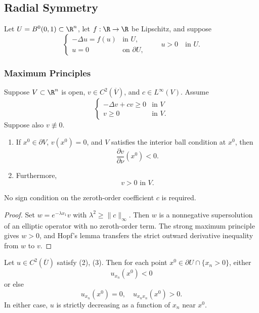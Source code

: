 \subsection{Radial Symmetry}
\label{sec:radial-symmetry}

Let $U=B^0(0,1)\subset\R^n$, let $f:\R\to\R$ be Lipschitz, and suppose
\[
\begin{cases}
-\Delta u=f(u) & \text{in }U,\\
u=0 & \text{on }\partial U,
\end{cases}
\tag{2}
\qquad
u>0\quad\text{in }U.
\tag{3}
\]

\subsubsection{Maximum Principles}
\label{sec:maximum-principles-radial-symmetry}

\begin{lemma}
\label{lem:hopf-lemma-refinement}
Suppose $V \subset \R^n$ is open, $v \in C^2(\overline{V})$, and $c \in L^\infty(V)$. Assume
\[
\begin{cases} -\Delta v + cv \geq 0 & \text{in } V \\ v \geq 0 & \text{in } V. \end{cases}
\tag{4}
\]
Suppose also $v \not\equiv 0$.
\begin{enumerate}
\item[(i)] If $x^0 \in \partial V$, $v(x^0) = 0$, and $V$ satisfies the interior ball condition at $x^0$, then
\[
\frac{\partial v}{\partial \nu}(x^0) < 0.
\tag{5}
\]
\item[(ii)] Furthermore,
\[
v > 0 \text{ in } V.
\tag{6}
\]
\end{enumerate}
No sign condition on the zeroth-order coefficient $c$ is required.
\end{lemma}

\begin{proof}
\sketch Set $w=e^{-\lambda x_1}v$ with $\lambda^2\geq\|c\|_\infty$. Then $w$ is a nonnegative supersolution of an elliptic operator with no zeroth-order term. The strong maximum principle gives $w>0$, and Hopf's lemma transfers the strict outward derivative inequality from $w$ to $v$.
\end{proof}

\begin{lemma}
\label{lem:boundary-estimates-radial-symmetry}
Let $u \in C^2(\overline{U})$ satisfy (2), (3). Then for each point $x^0 \in \partial U \cap \{x_n > 0\}$, either
\[
u_{x_n}(x^0) < 0
\tag{7}
\]
or else
\[
u_{x_n}(x^0) = 0, \quad u_{x_nx_n}(x^0) > 0.
\tag{8}
\]
In either case, $u$ is strictly decreasing as a function of $x_n$ near $x^0$.
\end{lemma}

